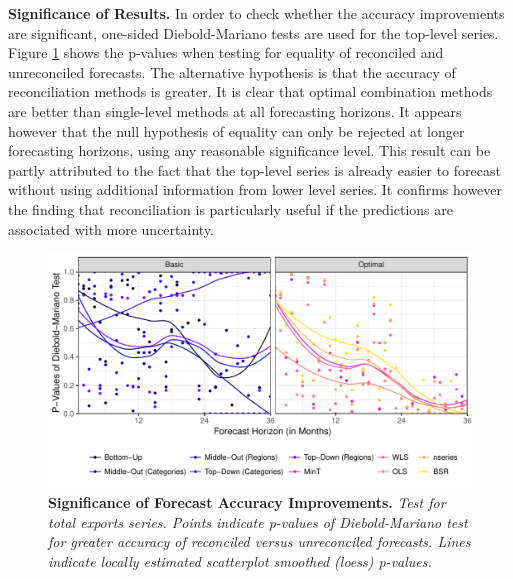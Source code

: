 \documentclass[a4paper,fleqn,11pt]{article}
\begin{document}
\clearpage

\noindent\textbf{Significance of Results.} In order to check whether the accuracy improvements are significant, one-sided Diebold-Mariano tests are used for the top-level series. Figure \ref{fig:dmtest} shows the p-values when testing for equality of reconciled and unreconciled forecasts. The alternative hypothesis is that the accuracy of reconciliation methods is greater. It is clear that optimal combination methods are better than single-level methods at all forecasting horizons. It appears however that the null hypothesis of equality can only be rejected at longer forecasting horizons, using any reasonable significance level. This result can be partly attributed to the fact that the top-level series is already easier to forecast without using additional information from lower level series. It confirms however the finding that reconciliation is particularly useful if the predictions are associated with more uncertainty.

\begin{figure}[H]
	\includegraphics[width=\textwidth]{fig/fig_dm}
	\caption[Significance of Forecast Accuracy Improvements]{\textbf{Significance of Forecast Accuracy Improvements.} \textit{Test for total exports series. Points indicate p-values of Diebold-Mariano test for greater accuracy of reconciled versus unreconciled forecasts. Lines indicate locally estimated scatterplot smoothed (loess) p-values.}} \label{fig:dmtest}
\end{figure}
\end{document}
